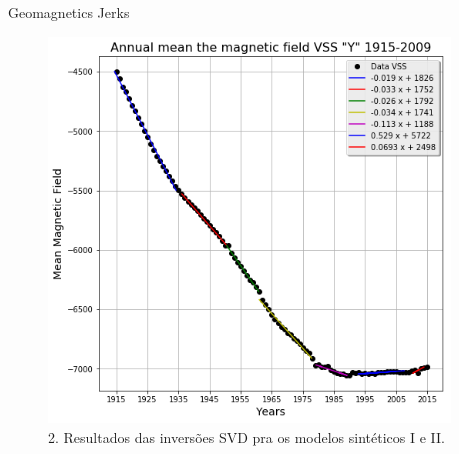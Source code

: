 \documentclass[final,t]{beamer}
\begin{document}
\begin{columns}[t]
\begin{column}{.31\linewidth}
\begin{block}{Geomagnetics Jerks}
	
\begin{figure}
	\centering
	\includegraphics[width=0.6\linewidth]{retasY}
	\caption{2. Resultados das inversões SVD pra os modelos sintéticos I e II.}
	\label{fig:g_Sintetico}
\end{figure}	
	
	

	
\end{block}


	
\end {column}	

\begin{column}{.31\linewidth}



\end{column}
\end{columns}
\end{document}

